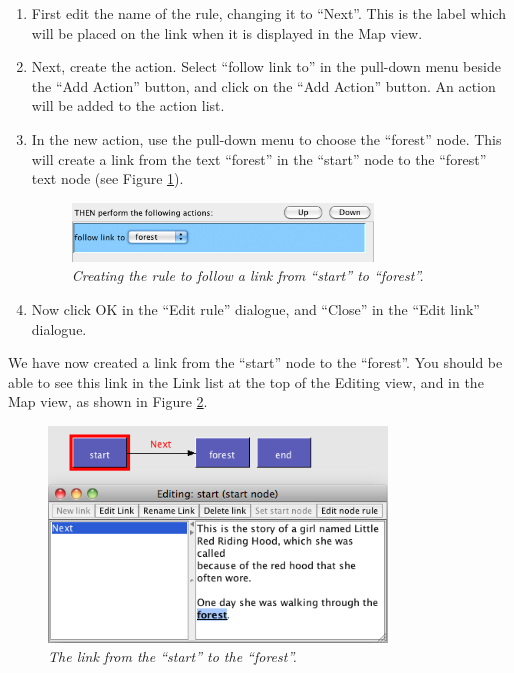 \documentclass{article}
\begin{document}
\begin{enumerate}
\item First edit the name of the rule, changing it to ``Next''. This is the
label which will be placed on the link when it is displayed in the Map view.

\item Next, create the action. Select ``follow link to'' in the pull-down menu
beside the ``Add Action'' button, and click on the ``Add Action'' button. An
action will be added to the action list.

\item In the new action, use the pull-down menu to choose the ``forest'' node.
This will create a link from the text ``forest'' in the ``start'' node to the
``forest'' text node (see Figure \ref{fig:tut1:create_action}).

\begin{figure}[ht]
  \centering
  \includegraphics[width=8cm]{images/hypedyn-tutorial-1-figure-8d}
  \caption{\textit{Creating the rule to follow a link from ``start'' to
  ``forest''.}}
  \label{fig:tut1:create_action}
\end{figure} 

\item Now click OK in the ``Edit rule'' dialogue, and ``Close'' in the ``Edit
link'' dialogue.
\end{enumerate}

We have now created a link from the ``start'' node to the ``forest''. You
should be able to see this link in the Link list at the top of the Editing
view, and in the Map view, as shown in Figure \ref{fig:tut1:new_link_mapview}.
  
\begin{figure}[ht]
  \centering
  \includegraphics[width=9cm]{images/hypedyn-tutorial-1-figure-9}
  \caption{\textit{The link from the ``start'' to the ``forest''.}}
  \label{fig:tut1:new_link_mapview}
\end{figure} 
\end{document}
